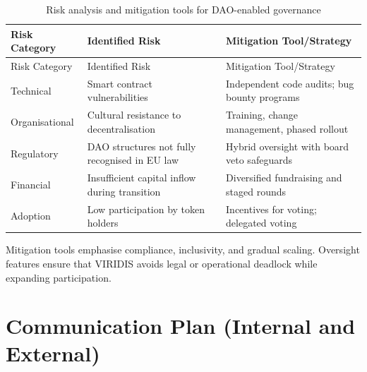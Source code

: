 \documentclass[
  english,
  12pt,
  oneside,
  open=any]{scrbook}
\begin{document}
\begin{longtable}[]{@{}
  >{\raggedright\arraybackslash}p{}
  >{\raggedright\arraybackslash}p{}
  >{\raggedright\arraybackslash}p{}@{}}
\caption{Risk analysis and mitigation tools for DAO-enabled
governance}\label{tbl-risks}\tabularnewline
\toprule\noalign{}
\begin{minipage}[b]{\linewidth}\raggedright
Risk Category
\end{minipage} & \begin{minipage}[b]{\linewidth}\raggedright
Identified Risk
\end{minipage} & \begin{minipage}[b]{\linewidth}\raggedright
Mitigation Tool/Strategy
\end{minipage} \\
\midrule\noalign{}
\endfirsthead
\toprule\noalign{}
\begin{minipage}[b]{\linewidth}\raggedright
Risk Category
\end{minipage} & \begin{minipage}[b]{\linewidth}\raggedright
Identified Risk
\end{minipage} & \begin{minipage}[b]{\linewidth}\raggedright
Mitigation Tool/Strategy
\end{minipage} \\
\midrule\noalign{}
\endhead
\bottomrule\noalign{}
\endlastfoot
Technical & Smart contract vulnerabilities & Independent code audits;
bug bounty programs \\
Organisational & Cultural resistance to decentralisation & Training,
change management, phased rollout \\
Regulatory & DAO structures not fully recognised in EU law & Hybrid
oversight with board veto safeguards \\
Financial & Insufficient capital inflow during transition & Diversified
fundraising and staged rounds \\
Adoption & Low participation by token holders & Incentives for voting;
delegated voting \\
\end{longtable}

Mitigation tools emphasise compliance, inclusivity, and gradual scaling.
Oversight features ensure that VIRIDIS avoids legal or operational
deadlock while expanding participation.

\section{Communication Plan (Internal and
External)}\label{sec-comm-plan}
\end{document}
